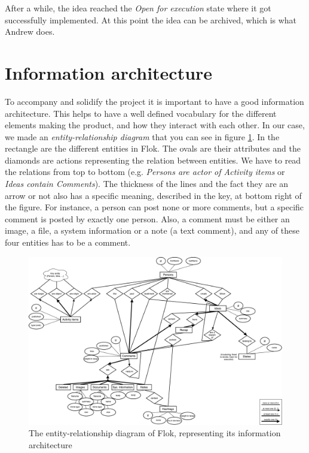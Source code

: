 \documentclass[a4paper,12pt,twoside]{article}
\begin{document}
After a while, the idea reached the \emph{Open for execution} state where it got successfully implemented.
At this point the idea can be archived, which is what Andrew does.

\section{Information architecture}
To accompany and solidify the project it is important to have a good information architecture.
This helps to have a well defined vocabulary for the different elements making the product, and how they interact with each other.
In our case, we made an \emph{entity-relationship diagram} that you can see in figure \ref{fig.erDiagram}.
In the rectangle are the different entities in Flok.
The ovals are their attributes and the diamonds are actions representing the relation between entities.
We have to read the relations from top to bottom (e.g. \emph{Persons are actor of Activity items} or \emph{Ideas contain Comments}).
The thickness of the lines and the fact they are an arrow or not also has a specific meaning, described in the key, at bottom right of the figure.
For instance, a person can post none or more comments, but a specific comment is posted by exactly one person.
Also, a comment must be either an image, a file, a system information or a note (a text comment), and any of these four entities has to be a comment.

\begin{figure}
    \centering
    \includegraphics[width=\textwidth]{images/erDiagram.pdf}
    \caption{The entity-relationship diagram of Flok, representing its information architecture}
    \label{fig.erDiagram}
\end{figure}
\end{document}
